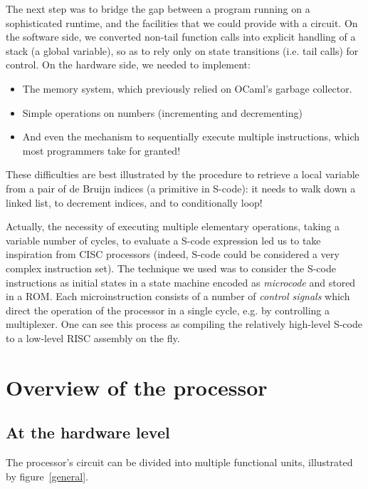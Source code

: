\documentclass[a4paper, 11pt]{article}
\begin{document}
The next step was to bridge the gap between a program running on a sophisticated runtime, and the facilities that we could provide with a circuit. On the software side, we converted non-tail function calls into explicit handling of a stack (a global variable), so as to rely only on state transitions (i.e. tail calls) for control. On the hardware side, we needed to implement:
\begin{itemize}
\item The memory system, which previously relied on OCaml's garbage collector.
\item Simple operations on numbers (incrementing and decrementing)
\item And even the mechanism to sequentially execute multiple instructions, which most programmers take for granted!
\end{itemize}
These difficulties are best illustrated by the procedure to retrieve a local variable from a pair of de Bruijn indices (a primitive in S-code): it needs to walk down a linked list, to decrement indices, and to conditionally loop!

Actually, the necessity of executing multiple elementary operations, taking a variable number of cycles, to evaluate a S-code expression led us to take inspiration from CISC processors (indeed, S-code could be considered a very complex instruction set). The technique we used was to consider the S-code instructions as initial states in a state machine encoded as \emph{microcode} and stored in a ROM. Each microinstruction consists of a number of \emph{control signals} which direct the operation of the processor in a single cycle, e.g. by controlling a multiplexer. One can see this process as compiling the relatively high-level S-code to a low-level RISC assembly on the fly.

\section{Overview of the processor}

\subsection{At the hardware level}

The processor's circuit can be divided into multiple functional units,
illustrated by figure~\ref{general}.
\end{document}
